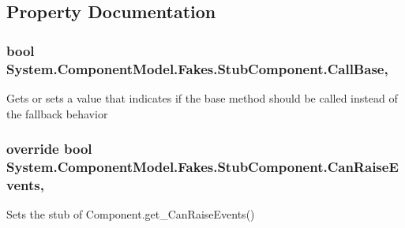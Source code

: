 \subsection{Property Documentation}
\hypertarget{class_system_1_1_component_model_1_1_fakes_1_1_stub_component_ab9116e26b965780c61ee28ca79efd3ea}{
\subsubsection[{Call\-Base}]{\setlength{\rightskip}{0pt plus 5cm}bool System.\-Component\-Model.\-Fakes.\-Stub\-Component.\-Call\-Base\hspace{0.3cm}{\ttfamily [get]}, {\ttfamily [set]}}}\label{class_system_1_1_component_model_1_1_fakes_1_1_stub_component_ab9116e26b965780c61ee28ca79efd3ea}


Gets or sets a value that indicates if the base method should be called instead of the fallback behavior

\hypertarget{class_system_1_1_component_model_1_1_fakes_1_1_stub_component_a492ed1e6217b2c1a8c4f98121b3cc6b7}{
\subsubsection[{Can\-Raise\-Events}]{\setlength{\rightskip}{0pt plus 5cm}override bool System.\-Component\-Model.\-Fakes.\-Stub\-Component.\-Can\-Raise\-Events\hspace{0.3cm}{\ttfamily [get]}, {\ttfamily [protected]}}}\label{class_system_1_1_component_model_1_1_fakes_1_1_stub_component_a492ed1e6217b2c1a8c4f98121b3cc6b7}


Sets the stub of Component.\-get\-\_\-\-Can\-Raise\-Events()

